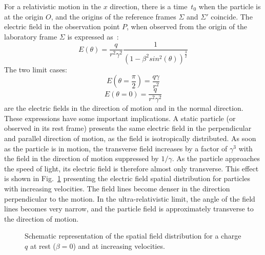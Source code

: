 For a relativistic motion in the $x$ direction, there is a time~$t_0$ when the particle is at the origin $O$, and the origins of the reference frames $\Sigma$ and $\Sigma'$ coincide. The electric field in the observation point $P$, when observed from the origin of the laboratory frame $\Sigma$ is expressed as~\cite{Jackson:490457}:
\begin{equation}
E\left( \theta \right) = \frac{q}{r^2 \gamma^2} \frac{1}{\left( 1 - \beta^2 sin^2\left(\theta\right) \right)^\frac{3}{2}}
\end{equation}
The two limit cases:
\begin{equation}
    E\left( \theta = \frac{\pi}{2} \right) = \frac{q \gamma}{r^2 }\label{eq:pi/2}
\end{equation}
\begin{equation}
    E\left( \theta = 0 \right) = \frac{q }{r^2 \gamma^2}\label{eq:zero}
\end{equation}
are the electric fields in the direction of motion and in the normal direction. These expressions have some important implications. A static particle (or observed in its rest frame) presents the same electric field in the perpendicular and parallel direction of motion, as the field is isotropically distributed. As soon as the particle is in motion, the transverse field increases by a factor of $\gamma^3$ with the field in the direction of motion suppressed by $1/\gamma$. As the particle approaches the speed of light, its electric field is therefore almost only transverse. This effect is shown in Fig.~\ref{fig:field_pattern} presenting the electric field spatial distribution for particles with increasing velocities. The field lines become denser in the direction perpendicular to the motion. In the ultra-relativistic limit, the angle of the field lines becomes very narrow, and the particle field is approximately transverse to the direction of motion.



\begin{figure}[!h]
\centering

\caption{Schematic representation of the spatial field distribution for a charge $q$ at rest ($\beta=0$) and at increasing velocities.}
\label{fig:field_pattern}
\end{figure}



